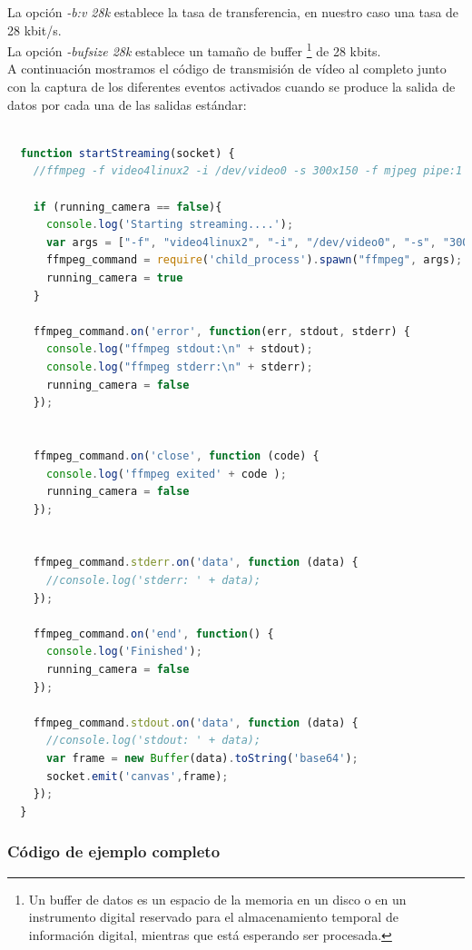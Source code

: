 La opción \emph{-b:v 28k} establece la tasa de transferencia, en nuestro caso una tasa de 28 kbit/s.\\

La opción \emph{-bufsize 28k} establece un tamaño de buffer \footnote{Un buffer de datos es un espacio de la memoria en un disco o en un instrumento digital reservado para el almacenamiento
temporal de información digital, mientras que está esperando ser procesada.} de 28 kbits.\\

A continuación mostramos el código de transmisión de vídeo al completo junto con la captura de los diferentes eventos activados cuando se produce la salida de datos por cada una de las salidas estándar:\\

\begin{lstlisting}[language=JavaScript]

  function startStreaming(socket) {
    //ffmpeg -f video4linux2 -i /dev/video0 -s 300x150 -f mjpeg pipe:1 -b:v 28k -bufsize 28k

    if (running_camera == false){
      console.log('Starting streaming....');
      var args = ["-f", "video4linux2", "-i", "/dev/video0", "-s", "300x150","-f","mjpeg", "pipe:1", "-b:v 28k", "-bufsize 28k"]
      ffmpeg_command = require('child_process').spawn("ffmpeg", args);
      running_camera = true
    }

    ffmpeg_command.on('error', function(err, stdout, stderr) {
      console.log("ffmpeg stdout:\n" + stdout);
      console.log("ffmpeg stderr:\n" + stderr);
      running_camera = false
    });


    ffmpeg_command.on('close', function (code) {
      console.log('ffmpeg exited' + code );
      running_camera = false
    });


    ffmpeg_command.stderr.on('data', function (data) {
      //console.log('stderr: ' + data);
    });

    ffmpeg_command.on('end', function() {
      console.log('Finished');
      running_camera = false
    });

    ffmpeg_command.stdout.on('data', function (data) {
      //console.log('stdout: ' + data);
      var frame = new Buffer(data).toString('base64');
      socket.emit('canvas',frame);
    });
  }

\end{lstlisting}


\subsubsection{Código de ejemplo completo}

